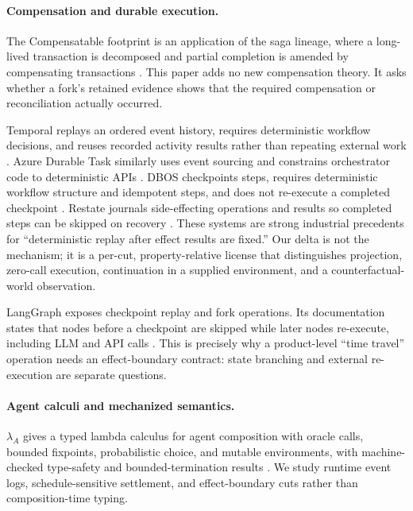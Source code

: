 \paragraph{Compensation and durable execution.}
The Compensatable footprint is an application of the saga lineage, where a
long-lived transaction is decomposed and partial completion is amended by
compensating transactions \cite{garciamolina1987sagas}.  This paper adds no new
compensation theory.  It asks whether a fork's retained evidence shows that the
required compensation or reconciliation actually occurred.

Temporal replays an ordered event history, requires deterministic workflow
decisions, and reuses recorded activity results rather than repeating external
work \cite{temporal2026workflows}.  Azure Durable Task similarly uses event
sourcing and constrains orchestrator code to deterministic APIs
\cite{azure2026constraints}.  DBOS checkpoints steps, requires deterministic
workflow structure and idempotent steps, and does not re-execute a completed
checkpoint \cite{dbos2026architecture}.  Restate journals side-effecting
operations and results so completed steps can be skipped on recovery
\cite{restate2026concepts}.  These systems are strong industrial precedents for
``deterministic replay after effect results are fixed.''  Our delta is not the
mechanism; it is a per-cut, property-relative license that distinguishes
projection, zero-call execution, continuation in a supplied environment, and a
counterfactual-world observation.

LangGraph exposes checkpoint replay and fork operations.  Its documentation
states that nodes before a checkpoint are skipped while later nodes re-execute,
including LLM and API calls \cite{langgraph2026timetravel}.  This is precisely
why a product-level ``time travel'' operation needs an effect-boundary contract:
state branching and external re-execution are separate questions.

\paragraph{Agent calculi and mechanized semantics.}
$\lambda_A$ gives a typed lambda calculus for agent composition with oracle
calls, bounded fixpoints, probabilistic choice, and mutable environments, with
machine-checked type-safety and bounded-termination results
\cite{liu2026lambdaa}.  We study runtime event logs, schedule-sensitive
settlement, and effect-boundary cuts rather than composition-time typing.


